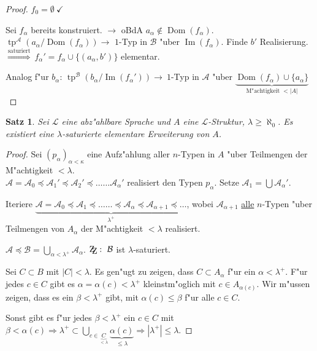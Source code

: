 \documentclass[a4paper,12pt,numbers=noenddot,parskip=full]{scrartcl}
\newcommand{\scrL}{\mathcal{L}}
\newcommand{\scrA}{\mathcal{A}}
\newcommand{\scrB}{\mathcal{B}}
\newcommand{\zz}{\mathrm{Z\kern-.3em\raise-0.5ex\hbox{Z}}:~}
\DeclareMathOperator{\im}{Im}
\DeclareMathOperator{\dom}{Dom}
\DeclareMathOperator{\typ}{tp}
\theoremstyle{dotless}
\newtheorem{theorem}{Satz}[section]
\begin{document}
\begin{proof}
	$f_0 = \emptyset~ \checkmark$
	
	Sei $f_\alpha$ bereits konstruiert. $\longrightarrow$ oBdA $a_\alpha \notin \dom(f_\alpha)$.\\
	$\typ^\scrA(a_\alpha/\dom(f_\alpha)) \longrightarrow$ $1$-Typ in $\scrB$ "uber $\im(f_\alpha)$. Finde $b'$ Realisierung. \\$\overset{\text{saturiert}}{\Longrightarrow}~ f_\alpha ' = f_\alpha \cup \{(a_\alpha, b') \}$ elementar.
	
	Analog f"ur $b_\alpha$: $\typ^\scrB(b_\alpha / \im(f_\alpha ')) \longrightarrow~1$-Typ in $\scrA$ "uber $\underbrace{\dom(f_\alpha) \cup \{a_\alpha\}}_{\text{M"achtigkeit }<|A|}$
\end{proof}
\begin{theorem}
	Sei $\scrL$ eine abz"ahlbare Sprache und $A$ eine $\scrL$-Struktur, $\lambda \geq \aleph_0$. Es existiert eine $\lambda$-saturierte elementare Erweiterung von $A$.
\end{theorem}
\begin{proof}
	Sei $(p_\alpha)_{\alpha<\kappa}$ eine Aufz"ahlung aller $n$-Typen in $A$ "uber Teilmengen der M"achtigkeit $< \lambda$.\\
	$\scrA = \scrA_0 \preceq \scrA_1 ' \preceq \scrA_2 ' \preceq \dots \dots \scrA_\alpha '$ realisiert den Typen $p_\alpha$. Setze $\scrA_1 = \bigcup \scrA_\alpha '$.
	
	Iteriere $\underbrace{\scrA = \scrA_0 \preceq \scrA_1 \preceq \dots \dots \preceq \scrA_\alpha \preceq \scrA_{\alpha+1} \preceq \dots }_{\lambda^+}$, wobei $\scrA_{\alpha+1}$ \underline{alle} $n$-Typen "uber Teilmengen von $A_\alpha$ der M"achtigkeit $< \lambda$ realisiert.
	
	$\scrA \preceq \scrB = \bigcup\limits _{\alpha < \lambda^+} \scrA_\alpha$. $\zz \scrB$ ist $\lambda$-saturiert.
	
	Sei $C \subset B$ mit $|C| < \lambda$. Es gen"ugt zu zeigen, dass $C \subset A_\alpha$ f"ur ein $\alpha <\lambda^+$. F"ur jedes $c \in C$ gibt es $\alpha = \alpha(c) < \lambda^+$ kleinstm"oglich mit $c \in A_{\alpha(c)}$. Wir m"ussen zeigen, dass es ein $\beta < \lambda^+$ gibt, mit $\alpha(c) \leq \beta$ f"ur alle $c \in C$.
	
	Sonst gibt es f"ur jedes $\beta < \lambda^+$ ein $c \in C$ mit $\beta < \alpha(c) \Longrightarrow \lambda^+ \subset \bigcup\limits_{c \in \underbrace{C}_{<\lambda}} \underbrace{\alpha(c)}_{\leq \lambda} {\Longrightarrow |\lambda^+| \leq \lambda}$.
\end{proof}
\end{document}
